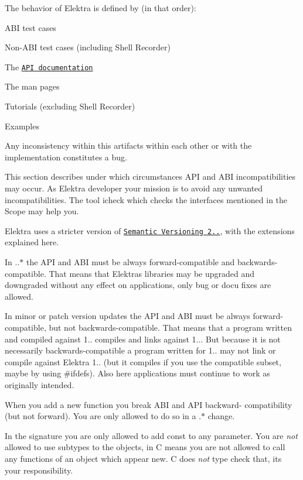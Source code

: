 The behavior of Elektra is defined by (in that order)\+:


\begin{DoxyEnumerate}
\item A\+BI test cases
\item Non-\/\+A\+BI test cases (including Shell Recorder)
\item The \href{https://doc.libelektra.org/api/master/html/}{\tt A\+PI documentation}
\item The man pages
\item Tutorials (excluding Shell Recorder)
\item Examples
\end{DoxyEnumerate}

Any inconsistency within this artifacts within each other or with the implementation constitutes a bug.

This section describes under which circumstances A\+PI and A\+BI incompatibilities may occur. As Elektra developer your mission is to avoid any unwanted incompatibilities. The tool icheck which checks the interfaces mentioned in the Scope may help you.

Elektra uses a stricter version of \href{https://semver.org/}{\tt Semantic Versioning 2..}, with the extensions explained here.

In {..$\ast$} the A\+PI and A\+BI must be always forward-\/compatible and backwards-\/compatible. That means that Elektra\textquotesingle{}s libraries may be upgraded and downgraded without any effect on applications, only bug or docu fixes are allowed.

In minor or patch version updates the A\+PI and A\+BI must be always forward-\/compatible, but not backwards-\/compatible. That means that a program written and compiled against 1.. compiles and links against 1... But because it is not necessarily backwards-\/compatible a program written for 1.. may not link or compile against Elektra 1.. (but it compiles if you use the compatible subset, maybe by using \#ifdefs). Also here applications must continue to work as originally intended.

When you add a new function you break A\+BI and A\+PI backward-\/ compatibility (but not forward). You are only allowed to do so in a {.$\ast$} change.

In the signature you are only allowed to add const to any parameter. You are {\itshape not} allowed to use subtypes to the objects, in C means you are not allowed to call any functions of an object which appear new. C does {\itshape not} type check that, it\textquotesingle{}s your responsibility.

